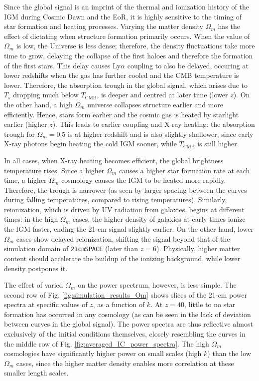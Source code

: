 \documentclass[floats,floatfix,showpacs,amssymb,prd,superscriptaddress,nofootinbib]{revtex4-2} %
\newcommand{\code}{\texttt}
\begin{document}
Since the global signal is an imprint of the thermal and ionization history of the IGM during Cosmic Dawn and the EoR, it is highly sensitive to the timing of star formation and heating processes. Varying the matter density $\Omega_m$ has the effect of dictating when structure formation primarily occurs. When the value of $\Omega_m$ is low, the Universe is less dense; therefore, the density fluctuations take more time to grow, delaying the collapse of the first haloes and therefore the formation of the first stars. This delay causes Ly$\alpha$ coupling to also be delayed, occuring at lower redshifts when the gas has further cooled and the CMB temperature is lower. Therefore, the absorption trough in the global signal, which arises due to $T_s$ dropping much below $T_\text{CMB}$, is deeper and centred at later time (lower $z$). On the other hand, a high $\Omega_m$ universe collapses structure earlier and more efficiently. Hence, stars form earlier and the cosmic gas is heated by starlight earlier (higher $z$). This leads to earlier coupling and X-ray heating: the absorption trough for $\Omega_m = 0.5$ is at higher redshift and is also slightly shallower, since early X-ray photons begin heating the cold IGM sooner, while $T_\text{CMB}$ is still higher. 

In all cases, when X-ray heating becomes efficient, the global brightness temperature rises. Since a higher $\Omega_m$ causes a higher star formation rate at each time, a higher $\Omega_m$ cosmology causes the IGM to be heated more rapidly. Therefore, the trough is narrower (as seen by larger spacing between the curves during falling temperatures, compared to rising temperatures). Similarly, reionization, which is driven by UV radiation from galaxies, begins at different times: in the high $\Omega_m$ cases, the higher density of galaxies at early times ionize the IGM faster, ending the 21-cm signal slightly earlier. On the other hand, lower $\Omega_m$ cases show delayed reionization, shifting the signal beyond that of the simulation domain of \code{21cmSPACE} (later than $z = 6$). Physically, higher matter content should accelerate the buildup of the ionizing background, while lower density postpones it.

The effect of varied $\Omega_m$ on the power spectrum, however, is less simple. The second row of Fig. \ref{fig:simulation_results_Om} shows slices of the 21-cm power spectra at specific values of $z$, as a function of $k$. At $z = 40$, little to no star formation has occurred in any cosmology (as can be seen in the lack of deviation between curves in the global signal). The power spectra are thus reflective almost exclusively of the initial conditions themselves, closely resembling the curves in the middle row of Fig. \ref{fig:averaged_IC_power_spectra}.
The high $\Omega_m$ cosmologies have significantly higher power on small scales (high $k$) than the low $\Omega_m$ cases, since the higher matter density enables more correlation at these smaller length scales. 
\end{document}
